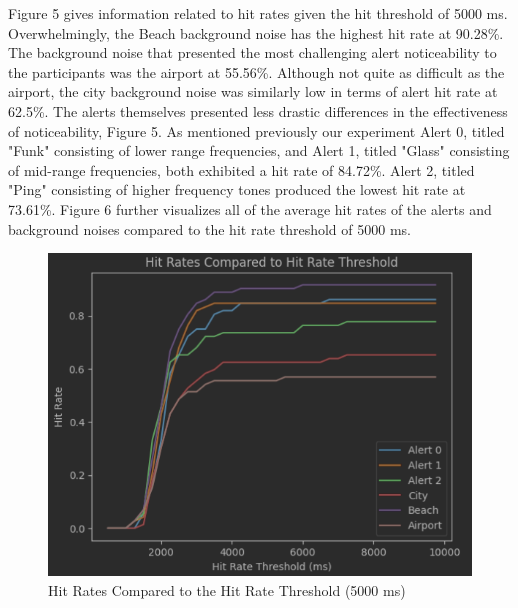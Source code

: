 \documentclass[manuscript,screen,review]{acmart}
\begin{document}
Figure 5 gives information related to hit rates given the hit threshold of 5000 ms. Overwhelmingly, the Beach background noise has the highest hit rate at 90.28\%. The background noise that presented the most challenging alert noticeability to the participants was the airport at 55.56\%. Although not quite as difficult as the airport, the city background noise was similarly low in terms of alert hit rate at 62.5\%. The alerts themselves presented less drastic differences in the effectiveness of noticeability, Figure 5. As mentioned previously our experiment Alert 0, titled "Funk" consisting of lower range frequencies, and Alert 1, titled "Glass" consisting of mid-range frequencies, both exhibited a hit rate of 84.72\%. Alert 2, titled "Ping" consisting of higher frequency tones produced the lowest hit rate at 73.61\%. Figure 6 further visualizes all of the average hit rates of the alerts and background noises compared to the hit rate threshold of 5000 ms.

\begin{figure}[h]
  \includegraphics[scale=0.5]{images/hit-thresholds.png}
  \caption{Hit Rates Compared to the Hit Rate Threshold (5000 ms)}
\end{figure}
\end{document}
